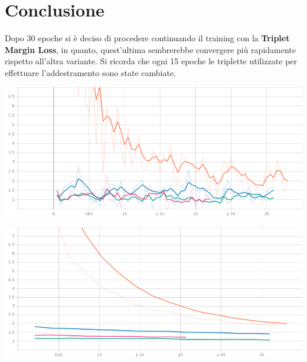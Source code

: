 \documentclass[11pt]{article}
\begin{document}
\pagebreak
\section{Conclusione}

Dopo 30 epoche si è deciso di procedere continuando il training con la \textbf{Triplet Margin Loss}, in quanto, quest'ultima 
sembrerebbe convergere più rapidamente rispetto all'altra variante. Si ricorda che 
ogni 15 epoche le triplette utilizzate per effettuare l'addestramento sono state cambiate. 

\begin{center}
    \begin{minipage}{0.45\linewidth}
    \includegraphics[width=\linewidth]{train_loss_2.png}
    \end{minipage}
    \begin{minipage}{0.45\linewidth}
    \includegraphics[width=\linewidth]{valid_loss_2.png}
    \end{minipage}
\end{center}
\end{document}
